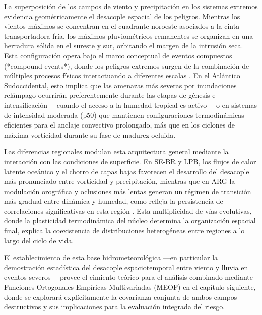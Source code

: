 La superposición de los campos de viento y precipitación en los sistemas extremos evidencia geométricamente el desacople espacial de los peligros. Mientras los vientos máximos se concentran en el cuadrante noroeste asociados a la cinta transportadora fría, los máximos pluviométricos remanentes se organizan en una herradura sólida en el sureste y sur, orbitando el margen de la intrusión seca. Esta configuración opera bajo el marco conceptual de eventos compuestos (*compound events*), donde los peligros extremos surgen de la combinación de múltiples procesos físicos interactuando a diferentes escalas \citep{zscheischler2018future}. En el Atlántico Sudoccidental, esto implica que las amenazas más severas por inundaciones relámpago ocurrirán preferentemente durante las etapas de génesis e intensificación —cuando el acceso a la humedad tropical es activo— o en sistemas de intensidad moderada (p50) que mantienen configuraciones termodinámicas eficientes para el anclaje convectivo prolongado, más que en los ciclones de máxima vorticidad durante su fase de madurez ocluida.

Las diferencias regionales modulan esta arquitectura general mediante la interacción con las condiciones de superficie. En SE-BR y LPB, los flujos de calor latente oceánico y el chorro de capas bajas favorecen el desarrollo del desacople más pronunciado entre vorticidad y precipitación, mientras que en ARG la modulación orográfica y oclusiones más lentas generan un régimen de transición más gradual entre dinámica y humedad, como refleja la persistencia de correlaciones significativas en esta región \citep{marrafon2022classificacao}. Esta multiplicidad de vías evolutivas, donde la plasticidad termodinámica del núcleo determina la organización espacial final, explica la coexistencia de distribuciones heterogéneas entre regiones a lo largo del ciclo de vida.

El establecimiento de esta base hidrometeorológica —en particular la demostración estadística del desacople espaciotemporal entre viento y lluvia en eventos severos— provee el cimiento teórico para el análisis combinado mediante Funciones Ortogonales Empíricas Multivariadas (MEOF) en el capítulo siguiente, donde se explorará explícitamente la covarianza conjunta de ambos campos destructivos y sus implicaciones para la evaluación integrada del riesgo.
